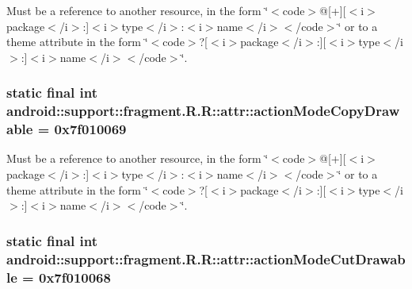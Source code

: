 Must be a reference to another resource, in the form \char`\"{}$<$code$>$@\mbox{[}+\mbox{]}\mbox{[}$<$i$>$package$<$/i$>$:\mbox{]}$<$i$>$type$<$/i$>$:$<$i$>$name$<$/i$>$$<$/code$>$\char`\"{} or to a theme attribute in the form \char`\"{}$<$code$>$?\mbox{[}$<$i$>$package$<$/i$>$:\mbox{]}\mbox{[}$<$i$>$type$<$/i$>$:\mbox{]}$<$i$>$name$<$/i$>$$<$/code$>$\char`\"{}. \hypertarget{classandroid_1_1support_1_1fragment_1_1_r_1_1attr_f7a6f1ef05bff3365e7e0b47824224db}{
\subsubsection[{actionModeCopyDrawable}]{\setlength{\rightskip}{0pt plus 5cm}static final int android::support::fragment.R.R::attr::actionModeCopyDrawable = 0x7f010069}}
\label{classandroid_1_1support_1_1fragment_1_1_r_1_1attr_f7a6f1ef05bff3365e7e0b47824224db}


Must be a reference to another resource, in the form \char`\"{}$<$code$>$@\mbox{[}+\mbox{]}\mbox{[}$<$i$>$package$<$/i$>$:\mbox{]}$<$i$>$type$<$/i$>$:$<$i$>$name$<$/i$>$$<$/code$>$\char`\"{} or to a theme attribute in the form \char`\"{}$<$code$>$?\mbox{[}$<$i$>$package$<$/i$>$:\mbox{]}\mbox{[}$<$i$>$type$<$/i$>$:\mbox{]}$<$i$>$name$<$/i$>$$<$/code$>$\char`\"{}. \hypertarget{classandroid_1_1support_1_1fragment_1_1_r_1_1attr_5c0b46c9d906975858faf72cc07797a5}{
\subsubsection[{actionModeCutDrawable}]{\setlength{\rightskip}{0pt plus 5cm}static final int android::support::fragment.R.R::attr::actionModeCutDrawable = 0x7f010068}}
\label{classandroid_1_1support_1_1fragment_1_1_r_1_1attr_5c0b46c9d906975858faf72cc07797a5}


